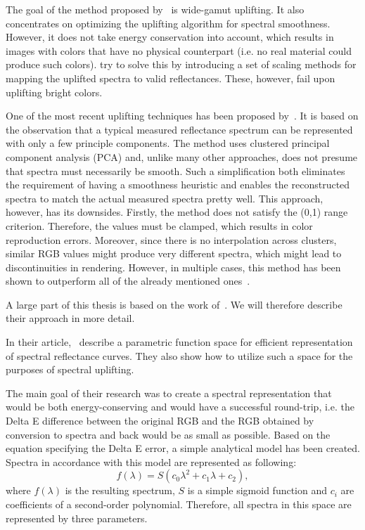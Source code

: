 The goal of the method proposed by~\citet{upsamplingMeng} is wide-gamut uplifting. It also concentrates on optimizing the uplifting algorithm for spectral smoothness. However, it does not take energy conservation into account, which results in images with colors that have no physical counterpart (i.e. no real material could produce such colors). \citet{upsamplingMeng} try to solve this by introducing a set of scaling methods for mapping the uplifted spectra to valid reflectances. These, however, fail upon uplifting bright colors. 

One of the most recent uplifting techniques has been proposed by~\citet{upsamplingOtsu}. It is based on the observation that a typical measured reflectance spectrum can be represented with only a few principle components. The method uses clustered principal component analysis (PCA) and, unlike many other approaches, does not presume that spectra must necessarily be smooth. Such a simplification both eliminates the requirement of having a smoothness heuristic and enables the reconstructed spectra to match the actual measured spectra pretty well. This approach, however, has its downsides. Firstly, the method does not satisfy the (0,1) range criterion. Therefore, the values must be clamped, which results in color reproduction errors. Moreover, since there is no interpolation across clusters, similar RGB values might produce very different spectra, which might lead to discontinuities in rendering. However, in multiple cases, this method has been shown to outperform all of the already mentioned ones~\cite{upsamplingJakobHanika}.

A large part of this thesis is based on the work of~\citet{upsamplingJakobHanika}. We will therefore describe their approach in more detail.

In their article,~\citet{upsamplingJakobHanika} describe a parametric function space for efficient representation of spectral reflectance curves. They also show how to utilize such a space for the purposes of spectral uplifting.

The main goal of their research was to create a spectral representation that would be both energy-conserving and would have a successful round-trip, i.e. the Delta E difference between the original RGB and the RGB obtained by conversion to spectra and back would be as small as possible. Based on the equation specifying the Delta E error, a simple analytical model has been created. Spectra in accordance with this model are represented as following:
\begin{equation} \label{sigmoidRepresentation}
f(\lambda)=S(c_{0}\lambda^2+c_{1}\lambda+c_{2}),
\end{equation}
where $f(\lambda)$ is the resulting spectrum, $S$ is a simple sigmoid function and $c_{i}$ are coefficients of a second-order polynomial. Therefore, all spectra in this space are represented by three parameters.

